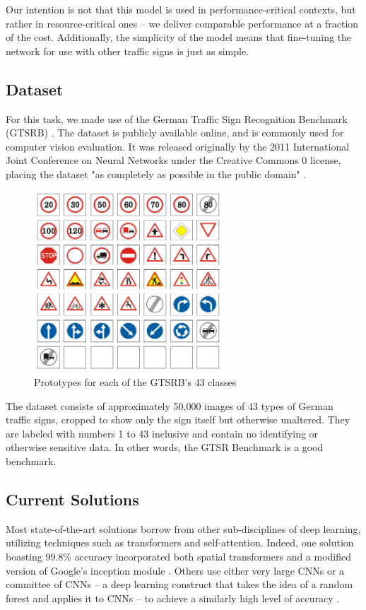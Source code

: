 \documentclass[10pt,twocolumn,letterpaper]{article}
\begin{document}
Our intention is not that this model is  used in performance-critical contexts, but rather in resource-critical ones -- we  deliver comparable performance at a fraction of the cost. Additionally, the  simplicity of the model means that fine-tuning the network for use with  other traffic signs is just as simple. 

\subsection{Dataset}
For this task, we made use of the German Traffic Sign Recognition Benchmark  (GTSRB) \cite{Stallkamp2012}. The dataset is publicly available online, and is commonly used for computer vision evaluation. It was released originally by the 2011  International Joint Conference on Neural Networks under the Creative Commons 0 license, placing the dataset "as completely as possible in the public domain" \cite{creative-commons-2017}. 

\begin{figure}[h]
\includegraphics[width=7cm]{class-examples}
\centering
\caption{Prototypes for each of the GTSRB's 43 classes}
\end{figure}

The dataset consists of approximately 50,000 images of 43 types of German traffic signs, cropped to show only the sign itself but otherwise unaltered. They are  labeled with numbers 1 to 43 inclusive and contain no identifying or otherwise sensitive data. In other words, the GTSR Benchmark is a good benchmark. 

\subsection{Current Solutions} 
Most state-of-the-art solutions borrow from other sub-disciplines of deep  learning, utilizing techniques such as transformers and self-attention.  Indeed, one solution boasting 99.8\% accuracy incorporated both spatial transformers and a modified version of Google's inception module \cite{https://doi.org/10.48550/arxiv.1511.02992}. Others  use either very large CNNs or a committee of CNNs -- a deep learning  construct that takes the idea of a random forest and applies it to CNNs -- to achieve a similarly high level of accuracy \cite{https://doi.org/10.48550/arxiv.1511.02992}. 
 
\end{document}
